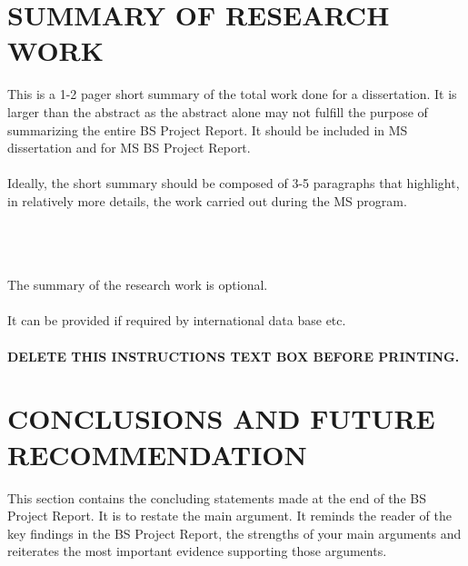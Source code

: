 \documentclass[a4paper,12pt,one side]{report}
\theoremstyle{definition}
\begin{document}
\begin{justify}
\chapter{SUMMARY OF RESEARCH WORK}
 This is a 1-2 pager short summary of the total work done for a dissertation. It is larger than the abstract as the abstract alone may not fulfill the purpose of summarizing the entire BS Project Report. It should be included in MS dissertation and for MS BS Project Report.\\~\\
Ideally, the short summary should be composed of 3-5 paragraphs that highlight, in relatively more details, the work carried out during the MS program.\\~\\
\\~\\

\begin{tcolorbox}[enhanced jigsaw,
    sharp corners,
    boxrule=0.5pt, 
    colback=blue!30!white,   
    borderline={0.5pt}{-2pt}{black,solid} %
 ]
 \begin{justify}
The summary of the research work is optional.\\~\\
It can be provided if required by international data base etc.\\~\\
{\bf DELETE THIS INSTRUCTIONS TEXT BOX BEFORE PRINTING.}
\end{justify}
\end{tcolorbox}
\chapter{CONCLUSIONS AND FUTURE RECOMMENDATION}
\noindent This section contains the concluding statements made at the end of the BS Project Report. It is to restate the main argument. It reminds the reader of the key findings in the BS Project Report, the strengths of your main arguments and reiterates the most important evidence supporting those arguments.\\


\end{justify}
\end{document}
